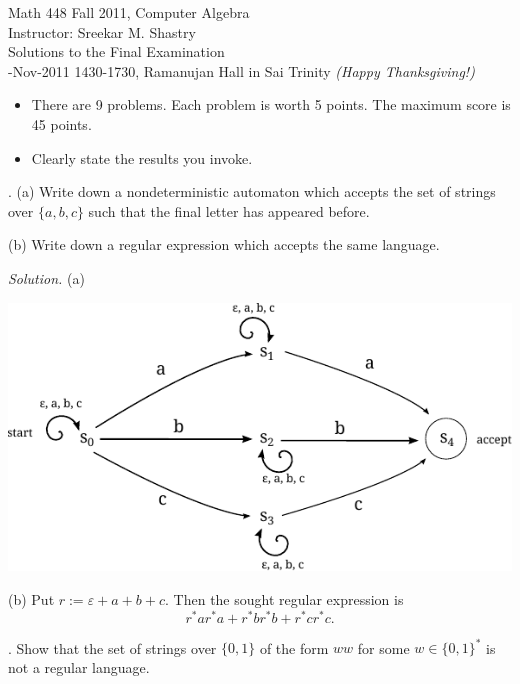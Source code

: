 \documentclass[10pt,a4paper,reqno]{amsart}
\begin{document}


\noindent Math 448 Fall 2011, Computer Algebra\\
\noindent Instructor: Sreekar M. Shastry\\
\noindent Solutions to the Final Examination\\
-Nov-2011 1430-1730, Ramanujan Hall in Sai Trinity \emph{(Happy Thanksgiving!)}

\bigskip

\begin{itemize}
    \item There are 9 problems. Each problem is worth 5 points. The maximum score is 45 points.
    \item Clearly state the results you invoke.
\end{itemize}

\bigskip

. (a) Write down a nondeterministic automaton which accepts the set
of strings over \(\{a,b,c\}\) such that the final letter has appeared before.

(b) Write down a regular expression which accepts the same language.

\bigskip

\emph{Solution.} (a)
    \begin{center}
        \includegraphics{resources/final-problem-1-nfa.pdf}
    \end{center}

(b) Put $r := \varepsilon + a + b + c$. Then the sought regular expression is
\[r^*ar^*a + r^*br^*b + r^*cr^*c.\]

\bigskip

. Show that the set of strings over \(\{0,1\}\) of the form $ww$ for some $w\in \{0,1\}^*$ is not a regular language.

\bigskip
\end{document}
